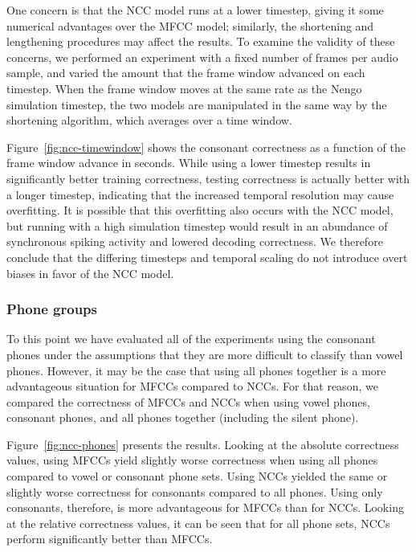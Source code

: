 One concern is that
the NCC model runs at a lower timestep,
giving it some numerical advantages
over the MFCC model;
similarly, the shortening and lengthening
procedures may affect the results.
To examine the validity of these concerns,
we performed an experiment
with a fixed number of frames
per audio sample,
and varied the amount that the frame window
advanced on each timestep.
When the frame window moves at the
same rate as the Nengo simulation timestep,
the two models are manipulated
in the same way by the
shortening algorithm,
which averages over a time window.


Figure~\ref{fig:ncc-timewindow}
shows the consonant correctness
as a function of the
frame window advance in seconds.
While using a lower timestep results in
significantly better training correctness,
testing correctness is actually better
with a longer timestep,
indicating that the increased temporal
resolution may cause overfitting.
It is possible that this overfitting
also occurs with the NCC model,
but running with a high simulation timestep
would result in an abundance of
synchronous spiking activity
and lowered decoding correctness.
We therefore conclude that the
differing timesteps and temporal scaling
do not introduce overt biases
in favor of the NCC model.

\subsubsection{Phone groups}

To this point we have
evaluated all of the experiments using
the consonant phones
under the assumptions that they are
more difficult to classify than vowel phones.
However, it may be the case that
using all phones together
is a more advantageous situation
for MFCCs compared to NCCs.
For that reason,
we compared the correctness
of MFCCs and NCCs when using
vowel phones, consonant phones,
and all phones together
(including the silent phone).


Figure~\ref{fig:ncc-phones} presents the results.
Looking at the absolute correctness values,
using MFCCs yield slightly worse correctness
when using all phones compared
to vowel or consonant phone sets.
Using NCCs yielded the same
or slightly worse correctness
for consonants compared to all phones.
Using only consonants, therefore,
is more advantageous for MFCCs
than for NCCs.
Looking at the relative correctness values,
it can be seen that for all phone sets,
NCCs perform significantly better
than MFCCs.

